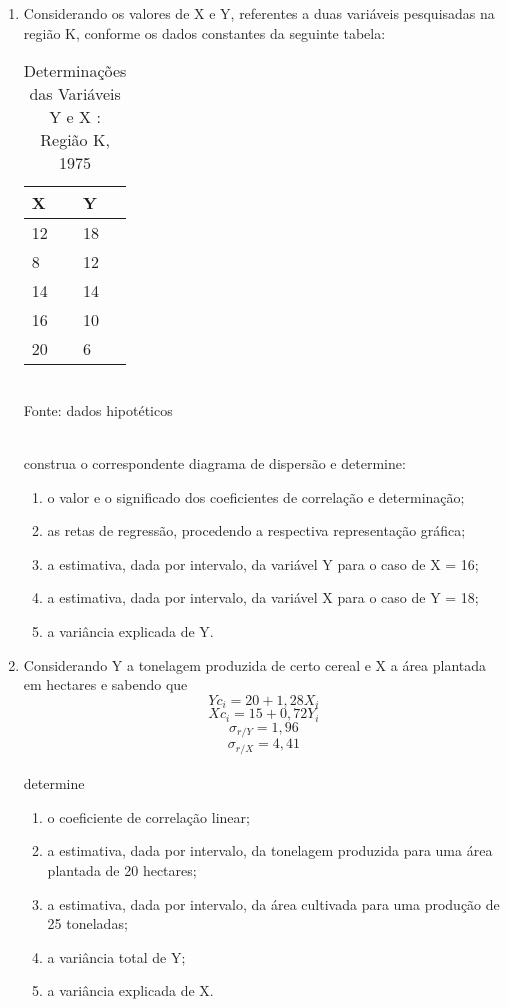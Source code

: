 \begin{enumerate}[resume]
\item Considerando os valores de X e Y, referentes a duas variáveis pesquisadas na região K, conforme os dados constantes da seguinte tabela:
	\begin{table}[!htb]
	\centering
	\caption{Determinações das Variáveis Y e X : Região K, 1975}
	\vspace{0.5cm}
	\begin{tabular}{ll}
	X & Y \\
	\hline 
	12 & 18  \\
	8 & 12 \\
	14 & 14  \\
	16 & 10  \\
	20 & 6  \\
	\end{tabular}\\
	Fonte: dados hipotéticos\\
	\end{table}\\	
	construa o correspondente diagrama de dispersão e determine:
	\begin{enumerate}
	\item o valor e o significado dos coeficientes de correlação e determinação;
	\item as retas de regressão, procedendo a respectiva representação gráfica;
	\item a estimativa, dada por intervalo, da variável Y para o caso de X = 16;
	\item	a estimativa, dada por intervalo, da variável X para o caso de Y = 18;
	\item a variância explicada de Y.
	\end{enumerate}
	
\item Considerando Y a tonelagem produzida de certo cereal e X a área plantada em hectares e sabendo que 
$$Yc_{i} = 20 + 1,28X_{i}$$
$$Xc_{i} = 15 + 0,72Y_{i}$$
$$\sigma_{r/Y} = 1,96$$
$$\sigma_{r/X} = 4,41$$
\\ determine
	\begin{enumerate}
	\item o coeficiente de correlação linear;
	\item a estimativa, dada por intervalo, da tonelagem produzida para uma área plantada de 20 hectares;
	\item a estimativa, dada por intervalo, da área cultivada para uma produção de 25 toneladas;
	\item a variância total de Y;
	\item a variância explicada de X.
	\end{enumerate}
	

\end{enumerate}
